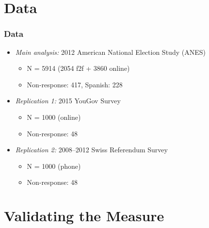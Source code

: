 \documentclass{beamer}
\begin{document}
\section{Data}

\begin{frame} %
\frametitle{Data}
	\begin{itemize}
	\item \emph{Main analysis:} 2012 American National Election Study (ANES)
		\begin{itemize}
		\item N = 5914 (2054 f2f + 3860 online)
		\item Non-response: 417, Spanish: 228
		\end{itemize}
		\vspace{1em}
	\item \emph{Replication 1:} 2015 YouGov Survey
		\begin{itemize}
		\item N = 1000 (online)
		\item Non-response: 48
		\end{itemize}
	\item \emph{Replication 2:} 2008--2012 Swiss Referendum Survey
		\begin{itemize}
		\item N = 1000 (phone)
		\item Non-response: 48
		\end{itemize}		
	\end{itemize}
\end{frame}


\section{Validating the Measure}
\end{document}
